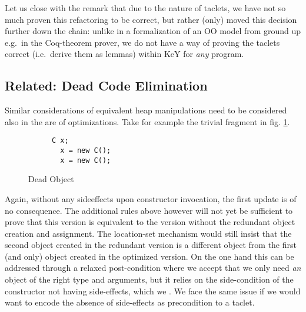Let us close with the remark that due to the nature of taclets, we have not so much proven this refactoring to be correct,
but rather (only) moved this decision further down the chain: unlike in a formalization of an OO model from ground up e.g.\ in the Coq-theorem prover,
we do not have a way of proving the taclets correct (i.e.\ derive them as lemmas) within KeY for \textit{any} program.

\subsection*{Related: Dead Code Elimination}
Similar considerations of equivalent heap manipulations need to be considered also in the are of optimizations.
Take for example the trivial fragment in fig. \ref{lst:xisnewxisnew}.
\begin{figure}
\centering
\begin{subfigure}{.3\linewidth}
\begin{lstlisting}[style=refinity]
  C x;
  x = new C();
  x = new C();
\end{lstlisting}
\end{subfigure}
\caption{Dead Object}
\label{lst:xisnewxisnew}
\end{figure}
Again, without any sideeffects upon constructor invocation, the first update is of no consequence.
The additional rules above however will not yet be sufficient to prove that this version is equivalent to the version without the redundant object creation and assignment.
The location-set mechanism would still insist that the second object created  in the redundant version is a different object from the first (and only) object created in the optimized version.
On the one hand this can be addressed through a relaxed post-condition where we accept that we only need \textit{an} object of the right type and arguments, but it relies on the side-condition of the constructor not having side-effects, which we .
We face the same issue if we would want to encode the absence of side-effects as precondition to a taclet.


